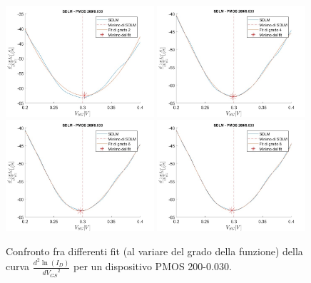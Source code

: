 \documentclass[
	a4paper,
	cleardoublepage=empty,
	headings=twolinechapter,
	numbers=autoenddot,
]{scrbook}
\begin{document}
\begin{figure}[h!]
  \centering
  \includegraphics[width=0.49\textwidth]{SDLM-P1-200-30-grado2}
  \includegraphics[width=0.49\textwidth]{SDLM-P1-200-30-grado4}
  \includegraphics[width=0.49\textwidth]{SDLM-P1-200-30-grado6}
  \includegraphics[width=0.49\textwidth]{SDLM-P1-200-30-grado8}
  \caption{Confronto fra differenti fit (al variare del grado della funzione) della curva $\frac{d^2 \ln(I_D)}{d {V_{GS}}^2}$ per un dispositivo PMOS 200-0.030.}
  \label{fig:GradiSDLM}
\end{figure}
\end{document}
